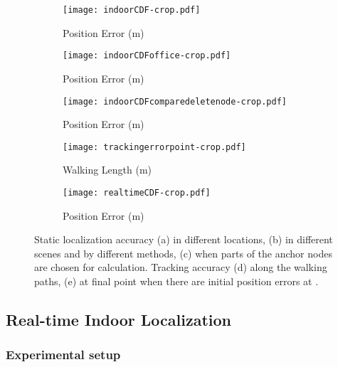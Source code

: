 \documentclass[]{sig-alternate-10pt}
\begin{document}
\begin{figure*}[htpb]
    \begin{subfigure}[c]{0.19\textwidth}
        \texttt{[image: indoorCDF-crop.pdf]}
        \caption{Position Error (m)}
    \label{fig:indoorCDF}
    \end{subfigure}
    \begin{subfigure}[c]{0.19\textwidth}
        \texttt{[image: indoorCDFoffice-crop.pdf]}
        \caption{Position Error (m)}
    \label{fig:indoorCDFoffice}
    \end{subfigure}
    \begin{subfigure}[c]{0.19\textwidth}
        \texttt{[image: indoorCDFcomparedeletenode-crop.pdf]}
    \caption{Position Error (m)}
    \label{fig:errordeletenode}
    \end{subfigure}
    \begin{subfigure}[c]{0.19\textwidth}
        \texttt{[image: trackingerrorpoint-crop.pdf]}
    \caption{Walking Length (m)}
    \label{fig:trackingerrordetail}
    \end{subfigure}
    \begin{subfigure}[c]{0.19\textwidth}
       \texttt{[image: realtimeCDF-crop.pdf]}
        \caption{Position Error (m)}
        \label{fig:initialerroreffect}
        \end{subfigure}
    \caption{ Static localization accuracy (a) in different locations,
      (b) in different scenes and by different methods, (c) when parts
      of the anchor nodes are chosen for calculation.  Tracking
      accuracy (d) along the walking paths, (e) at final point
       when there are initial position errors at .  } 
\end{figure*}

\subsection{Real-time Indoor Localization}
\label{sec:indorrexp}
\subsubsection{Experimental setup}
\end{document}
